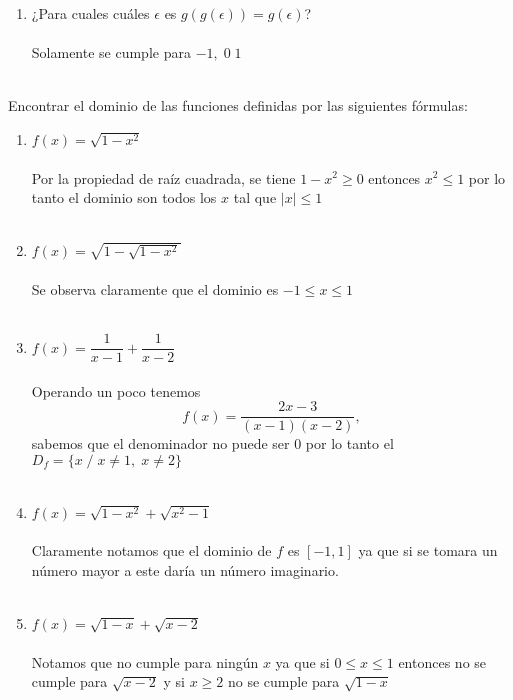 \begin{ej}
\begin{enumerate}[\bfseries i)]
\item ¿Para cuales cuáles $\epsilon$ es $g(g(\epsilon)) = g(\epsilon)$?\\\\
Solamente se cumple para $-1, \; 0 \; 1$\\\\
\end{enumerate}
\end{ej}

\begin{ej}
Encontrar el dominio de las funciones definidas por las siguientes fórmulas:
\begin{enumerate}[\bfseries i)]
\item $f(x)=\sqrt{1-x^2}$\\\\
Por la propiedad de raíz cuadrada, se tiene  $1-x^2 \geq 0$ entonces $x^2 \leq 1$ por lo tanto el dominio son todos los $x$ tal que $|x| \leq 1$\\\\

\item $f(x)=\sqrt{1-\sqrt{1-x^2}}$\\\\
Se observa claramente que el dominio es $-1\leq x \leq 1$\\\\

\item $f(x)=\dfrac{1}{x-1} + \dfrac{1}{x-2}$\\\\
Operando un poco tenemos $$f(x)=\dfrac{2x-3}{(x-1)(x-2)},$$ sabemos que el denominador no puede ser $0$ por lo tanto el $D_{f} = \lbrace x\; / \; x \neq 1, \; x\neq  2 \rbrace$\\\\ 

\item $f(x)=\sqrt{1-x^2}+\sqrt{x^2-1}$\\\\
Claramente notamos que el dominio de $f$ es $[-1,1]$ ya que si se tomara un número mayor a este daría un número imaginario.\\\\

\item $f(x) = \sqrt{1-x} + \sqrt{x-2}$\\\\
Notamos que no cumple para ningún $x$ ya que si $0\leq x \leq 1$ entonces no se cumple para $\sqrt{x-2} $ y si $x\geq 2$ no se cumple para $\sqrt{1-x}$\\\\ 
\end{enumerate}
\end{ej}

